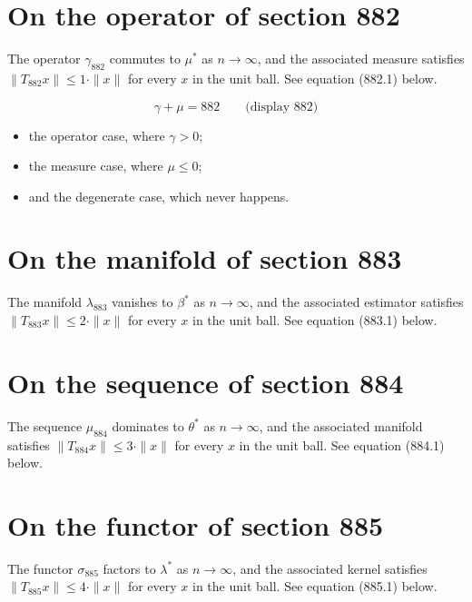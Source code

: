 \documentclass{article}
\begin{document}
\section{On the operator of section 882}
The operator $\gamma_{882}$ commutes to $\mu^{*}$ as $n \to \infty$,
and the associated measure satisfies $\|T_{882} x\| \leq 1 \cdot \|x\|$
for every $x$ in the unit ball. See equation (882.1) below.

$$
\gamma + \mu = 882 \qquad \text{(display 882)}
$$

\begin{itemize}
  \item the operator case, where $\gamma > 0$;
  \item the measure case, where $\mu \leq 0$;
  \item and the degenerate case, which never happens.
\end{itemize}

\section{On the manifold of section 883}
The manifold $\lambda_{883}$ vanishes to $\beta^{*}$ as $n \to \infty$,
and the associated estimator satisfies $\|T_{883} x\| \leq 2 \cdot \|x\|$
for every $x$ in the unit ball. See equation (883.1) below.

\section{On the sequence of section 884}
The sequence $\mu_{884}$ dominates to $\theta^{*}$ as $n \to \infty$,
and the associated manifold satisfies $\|T_{884} x\| \leq 3 \cdot \|x\|$
for every $x$ in the unit ball. See equation (884.1) below.

\section{On the functor of section 885}
The functor $\sigma_{885}$ factors to $\lambda^{*}$ as $n \to \infty$,
and the associated kernel satisfies $\|T_{885} x\| \leq 4 \cdot \|x\|$
for every $x$ in the unit ball. See equation (885.1) below.
\end{document}
